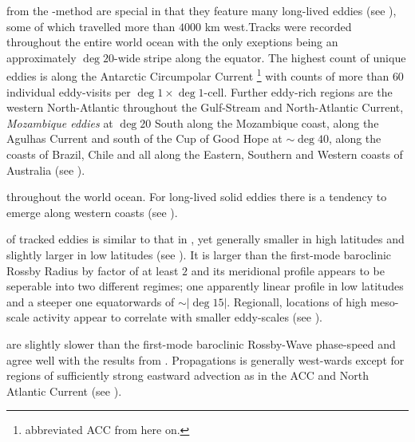 \newcommand{\run}[1]{#1-aviI}
\newcommand{\RUN}{\aviI:\;}
 from the \MI -method are special in that they feature many long-lived eddies (see ),
some of which travelled more than $4000$ km west.Tracks were recorded throughout the entire world ocean with the only exeptions being an approximately $\deg{20}$-wide stripe along the equator. The highest count of unique eddies is along the Antarctic Circumpolar Current \footnote{abbreviated ACC from here on.} with counts of more than $60$ individual eddy-visits per $\deg{1} \times \deg{1}$-cell. Further eddy-rich regions are the western North-Atlantic throughout the Gulf-Stream and North-Atlantic Current, \textit{Mozambique eddies} \citep{schouten2003eddies} at $\deg{20}$ South along the Mozambique coast, along the Agulhas Current and south of the Cup of Good Hope at $\sim \deg{40}$, along the coasts of Brazil, Chile and all along the Eastern, Southern and Western coasts of Australia (see ).

  throughout the world ocean. For long-lived solid eddies there is a tendency to emerge along western coasts (see ).

 \scale of tracked eddies is similar to that in \citet{them}, yet generally smaller in high latitudes and slightly larger in low latitudes (see ). It is larger than the first-mode baroclinic Rossby Radius by factor of at least $2$ and its meridional profile appears to be seperable into two different regimes; one apparently linear profile in low latitudes and a steeper one equatorwards of $\sim \left| \deg{15} \right|$. Regionall, locations of high meso-scale activity appear to correlate with smaller eddy-scales (see ).

 are slightly slower than the first-mode baroclinic Rossby-Wave phase-speed and agree well with the results from \citet{them}. Propagations is generally west-wards except for regions of sufficiently strong eastward advection as in the ACC and North Atlantic Current (see ).

